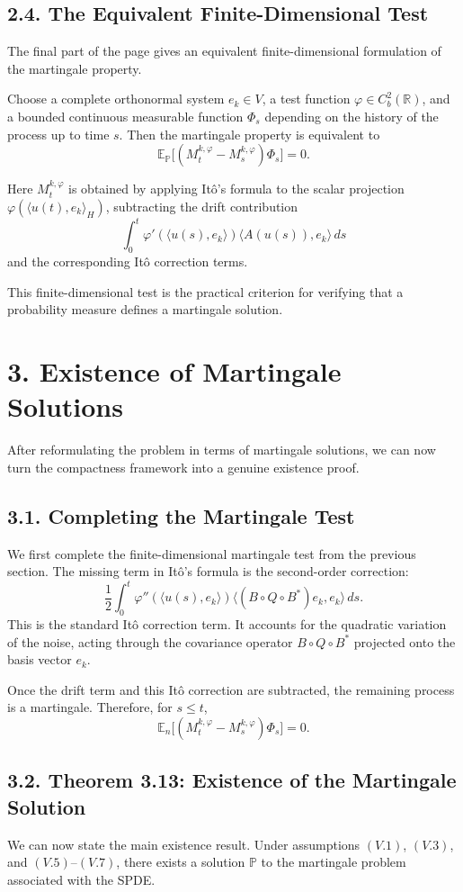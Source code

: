 \documentclass[11pt]{article}
\theoremstyle{definition}
\theoremstyle{remark}
\begin{document}
\subsection*{2.4. The Equivalent Finite-Dimensional Test}
The final part of the page gives an equivalent finite-dimensional formulation of the martingale property.

Choose a complete orthonormal system \(e_k\in V\), a test function \(\varphi\in C_b^2(\mathbb R)\), and a bounded continuous measurable function \(\Phi_s\) depending on the history of the process up to time \(s\). Then the martingale property is equivalent to
\[
\mathbb E_{\mathbb P}\bigl[(M_{t}^{k,\varphi}-M_{s}^{k,\varphi})\Phi_s\bigr]=0.
\]

Here \(M_t^{k,\varphi}\) is obtained by applying It\^o's formula to the scalar projection \(\varphi(\langle u(t),e_k\rangle_H)\), subtracting the drift contribution
\[
\int_0^t \varphi'(\langle u(s),e_k\rangle)\langle A(u(s)),e_k\rangle\,ds
\]
and the corresponding It\^o correction terms.

This finite-dimensional test is the practical criterion for verifying that a probability measure defines a martingale solution.

\section*{3. Existence of Martingale Solutions}
After reformulating the problem in terms of martingale solutions, we can now turn the compactness framework into a genuine existence proof.

\subsection*{3.1. Completing the Martingale Test}
We first complete the finite-dimensional martingale test from the previous section. The missing term in It\^o's formula is the second-order correction:
\[
\frac12 \int_0^t
\varphi''(\langle u(s),e_k\rangle)
\langle (B\circ Q\circ B^*)e_k,e_k\rangle\,ds.
\]
This is the standard It\^o correction term. It accounts for the quadratic variation of the noise, acting through the covariance operator \(B\circ Q\circ B^*\) projected onto the basis vector \(e_k\).

Once the drift term and this It\^o correction are subtracted, the remaining process is a martingale. Therefore, for \(s\le t\),
\[
\mathbb E_n\bigl[(M_t^{k,\varphi}-M_s^{k,\varphi})\Phi_s\bigr]=0.
\]

\subsection*{3.2. Theorem 3.13: Existence of the Martingale Solution}
We can now state the main existence result. Under assumptions \((V.1)\), \((V.3)\), and \((V.5)\)--\((V.7)\), there exists a solution \(\mathbb P\) to the martingale problem associated with the SPDE.
\end{document}
